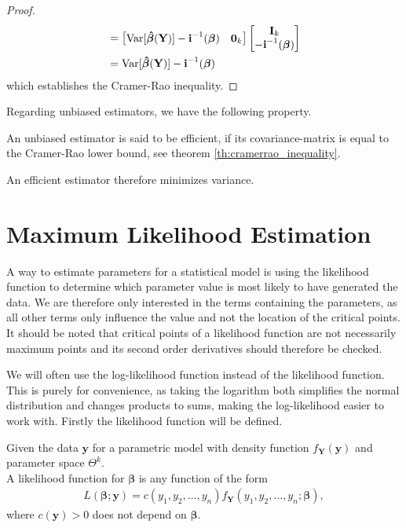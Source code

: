 \begin{proof}
\begin{align*}
    &= \begin{bmatrix} \operatorname{\text{Var}}[\boldsymbol{\hat{\beta}}(\textbf{Y})] -\textbf{i}^{-1}(\boldsymbol{\beta}) & \textbf{0}_{k}\end{bmatrix} \begin{bmatrix} \textbf{I}_{k} \\ -\textbf{i}^{-1}(\boldsymbol{\beta})\end{bmatrix} \\
    &= \operatorname{\text{Var}}[\boldsymbol{\hat{\beta}}(\textbf{Y})] -\textbf{i}^{-1}(\boldsymbol{\beta})
\end{align*}
which establishes the Cramer-Rao inequality.
\end{proof}
Regarding unbiased estimators, we have the following property.
\begin{definition} 
\label{def:efficient_estimator}
An unbiased estimator is said to be efficient, if its covariance-matrix is equal to the Cramer-Rao lower bound, see theorem \ref{th:cramerrao_inequality}.
\end{definition}
An efficient estimator therefore minimizes variance. 
 
\section{Maximum Likelihood Estimation}

A way to estimate parameters for a statistical model is using the likelihood function to determine which parameter value is most likely to have generated the data. We are therefore only interested in the terms containing the parameters, as all other terms only influence the value and not the location of the critical points. It should be noted that critical points of a likelihood function are not necessarily maximum points and its second order derivatives should therefore be checked.

We will often use the log-likelihood function instead of the likelihood function. 
This is purely for convenience, as taking the logarithm both simplifies the normal distribution and changes products to sums, making the log-likelihood easier to work with. Firstly the likelihood function will be defined.

\newpage
\begin{definition} 
\label{def:likelihood_function}
Given the data $\textbf{y}$ for a parametric model with density function $f_\textbf{Y}(\textbf{y})$ and parameter space $\Theta^k$.\\
A likelihood function for $\boldsymbol{\beta}$ is any function of the form 
\begin{align*}
    L(\boldsymbol{\beta}; \textbf{y}) = c(y_1, y_2, \ldots, y_n)f_\textbf{Y}(y_1, y_2, \ldots, y_n; \boldsymbol{\beta}), 
\end{align*}
where $c(\textbf{y})>0$ does not depend on $\boldsymbol{\beta}$. 
\end{definition}

